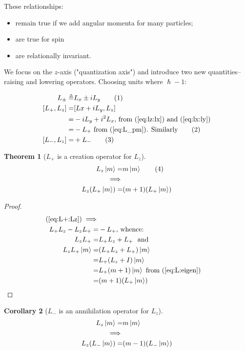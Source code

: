 \documentclass[]{article}
\newcommand\numberthis{\addtocounter{equation}{1}\tag{\theequation}}
\newtheorem{thm}{Theorem}
\newtheorem{cor}[thm]{Corollary}
\begin{document}
 These relationships:
\begin{itemize}
	\item remain true if we add angular momenta for many particles;
	\item are true for spin
	 \item are relationally invariant.
\end{itemize}

We focus on the $z$-axis ("quantization axis") and introduce two new quantities--raising and lowering operators. Choosing units where $\hslash-1$:

\begin{align*}
	L_\pm \triangleq& L_x \pm i L_y \numberthis \label{eq:L_pm} \\
	[L_+,L_z] =& [Lx+i L_y,L_z]\\
	=& -iL_y + i^2 L_x \text{, from (\ref{eq:lz:lx}) and (\ref{eq:lx:ly})}\\
	=& -L_+ \text{ from (\ref{eq:L_pm}). Similarly} \numberthis \label{eq:L+:Lz}\\
	[L_-,L_z] =& + L_- \numberthis \label{eq:L-:Lz}
\end{align*}

\begin{thm}[$L_+$ is a creation operator for $L_z$]\label{thm:angular:momentum:creation}
	\begin{align*}
		L_z \ket{m} =& m \ket{m} \numberthis \label{eq:L:eigen}\\
		\implies&\\
		L_z (L_+ \ket{m}) =& (m+1) (L_+ \ket{m})
	\end{align*}	
\end{thm}

\begin{proof}
	\begin{align*}
		(\ref{eq:L+:Lz})\implies\\
		L_+L_z-L_zL_+ =& -L_+ \text{, whence:}\\
		L_zL_+ =& L_+L_z + L_+\ \text{ and}\\
		L_z L_+ \ket{m} =& (L_+L_z + L_+)\ket{m}\\
		=& L_+ (L_z + I)\ket{m}\\
		=& L_+ (m + 1) \ket{m} \text{ from (\ref{eq:L:eigen})}\\
		=&  (m + 1) (L_+ \ket{m})
	\end{align*}
\end{proof}

\begin{cor}[$L_-$ is an annihilation  operator for $L_z$]
	\begin{align*}
	L_z \ket{m} =& m \ket{m} \\
	\implies&\\
	L_z (L_- \ket{m}) =& (m-1) (L_- \ket{m})
	\end{align*}	
\end{cor}
\end{document}
